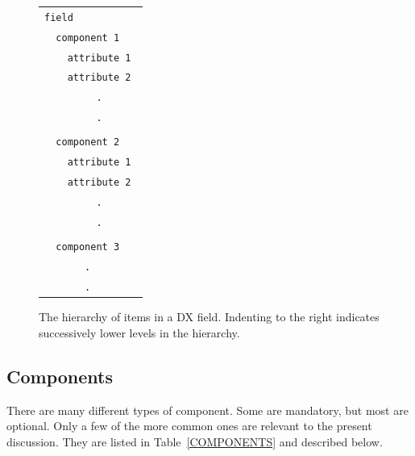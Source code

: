 \documentclass[twoside,11pt]{article}
\begin{document}
\begin{figure}[htbp]

\begin{center}

\begin{tabular}{l}
{\tt field     } \\
{\tt ~~component 1   } \\
{\tt ~~~~attribute 1 } \\
{\tt ~~~~attribute 2 } \\
{\tt ~~~~~~~~~.      } \\
{\tt ~~~~~~~~~.      } \\
    \\
{\tt ~~component 2   } \\
{\tt ~~~~attribute 1 } \\
{\tt ~~~~attribute 2 } \\
{\tt ~~~~~~~~~.      } \\
{\tt ~~~~~~~~~.      } \\
   \\
{\tt ~~component 3   } \\
{\tt ~~~~~~~.        } \\
{\tt ~~~~~~~.        } \\
\end{tabular}
\end{center}

\begin{quote}
\caption[The hierarchy of items in a DX field.]{The hierarchy of items in
a DX field. Indenting to the right indicates successively lower levels in
the hierarchy. \label{DXITEMS} }
\end{quote}

\end{figure}

\subsection{Components}

There are many different types of component. Some are mandatory, but
most are optional. Only a few of the more common ones are relevant to
the present discussion. They are listed in Table~\ref{COMPONENTS} and
described below.
\end{document}
